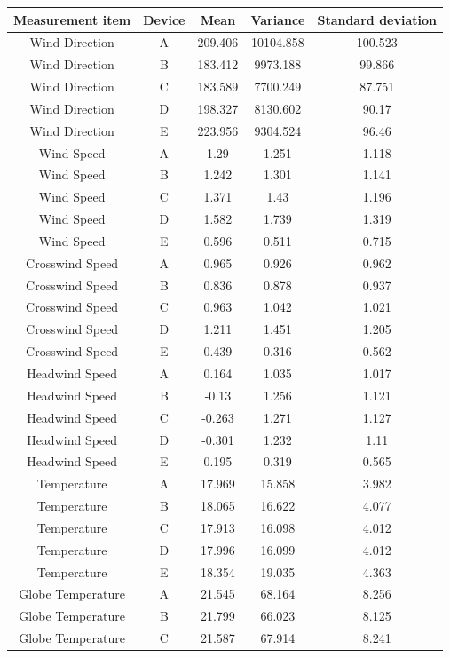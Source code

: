 \documentclass[a4paper]{article}
\numberwithin{figure}{section}
\numberwithin{table}{section}
\begin{document}
\begin{longtable}{ccccc}
\label{Table: A1}

Measurement item & Device & Mean & Variance & Standard deviation\\
\hline
Wind Direction & A & 209.406 & 10104.858 & 100.523 \\
Wind Direction & B & 183.412 & 9973.188 & 99.866 \\
Wind Direction & C & 183.589 & 7700.249 & 87.751 \\
Wind Direction & D & 198.327 & 8130.602 & 90.17 \\
Wind Direction & E & 223.956 & 9304.524 & 96.46 \\
Wind Speed & A & 1.29 & 1.251 & 1.118 \\
Wind Speed & B & 1.242 & 1.301 & 1.141 \\
Wind Speed & C & 1.371 & 1.43 & 1.196 \\
Wind Speed & D & 1.582 & 1.739 & 1.319 \\
Wind Speed & E & 0.596 & 0.511 & 0.715 \\
Crosswind Speed & A & 0.965 & 0.926 & 0.962 \\
Crosswind Speed & B & 0.836 & 0.878 & 0.937 \\
Crosswind Speed & C & 0.963 & 1.042 & 1.021 \\
Crosswind Speed & D & 1.211 & 1.451 & 1.205 \\
Crosswind Speed & E & 0.439 & 0.316 & 0.562 \\
Headwind Speed & A & 0.164 & 1.035 & 1.017 \\
Headwind Speed & B & -0.13 & 1.256 & 1.121 \\
Headwind Speed & C & -0.263 & 1.271 & 1.127 \\
Headwind Speed & D & -0.301 & 1.232 & 1.11 \\
Headwind Speed & E & 0.195 & 0.319 & 0.565 \\
Temperature & A & 17.969 & 15.858 & 3.982 \\
Temperature & B & 18.065 & 16.622 & 4.077 \\
Temperature & C & 17.913 & 16.098 & 4.012 \\
Temperature & D & 17.996 & 16.099 & 4.012 \\
Temperature & E & 18.354 & 19.035 & 4.363 \\
Globe Temperature & A & 21.545 & 68.164 & 8.256 \\
Globe Temperature & B & 21.799 & 66.023 & 8.125 \\
Globe Temperature & C & 21.587 & 67.914 & 8.241 \\

\end{longtable}
\end{document}

